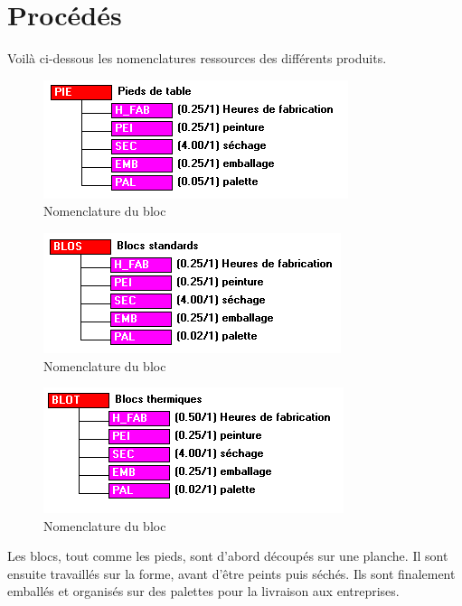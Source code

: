\section{Procédés}

Voilà ci-dessous les nomenclatures ressources des différents produits.

	\begin{figure}[H]
\centering
\includegraphics[scale=0.35]{./captures/pied.PNG}
\caption{Nomenclature du bloc}
	\end{figure}	
	
		\begin{figure}[H]
\centering
\includegraphics[scale=0.35]{./captures/standard.PNG}
\caption{Nomenclature du bloc}
	\end{figure}	
	
	
		\begin{figure}[H]
\centering
\includegraphics[scale=0.35]{./captures/thermique.PNG}
\caption{Nomenclature du bloc}
	\end{figure}	

Les blocs, tout comme les pieds, sont d'abord découpés sur une planche. Il sont ensuite travaillés sur la forme, avant d'être peints puis séchés. Ils sont finalement emballés et organisés sur des palettes pour la livraison aux entreprises.
